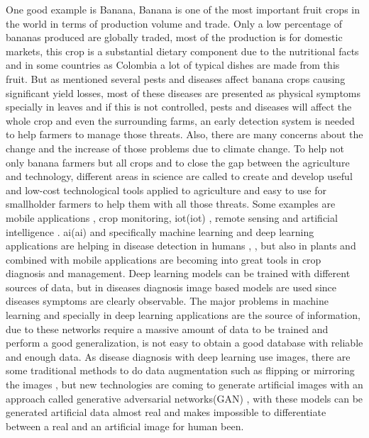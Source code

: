 One good example is Banana, Banana is one of the most important fruit crops in the world  in terms of production volume and trade\cite{faostat2014food}. Only a low percentage of bananas produced are globally traded\cite{lescot2013world}, most of the production is for domestic markets, this crop is a substantial dietary component \cite{abele2007bacterial} due to the nutritional facts and in some countries as Colombia a lot of typical dishes are made from this fruit.
But as mentioned several pests and diseases affect banana crops causing significant yield losses\cite{blomme2017bacterial}, most of these diseases are presented as physical symptoms specially in leaves and if this is not controlled, pests and diseases will affect the whole crop and even the surrounding farms, an early detection system is needed to help farmers to manage those threats. Also, there are many concerns about the change and the increase of those problems due to climate change\cite{garrett2013cambio}\cite{hamada2011impacts}. To help not only banana farmers but all crops and to close the gap between the agriculture and technology, different areas in science are called to create and develop useful and low-cost technological tools applied to agriculture and easy to use for smallholder farmers to help them with all those threats. Some examples are mobile applications \cite{qiang2012mobile} , crop monitoring\cite{berni2009thermal}\cite{hunt2010acquisition}, \acrlong{iot}(\acrshort{iot}) \cite{baoyun2009review} , remote sensing\cite{doraiswamy2003crop} and artificial intelligence \cite{murase2000artificial}. 
\acrlong{ai}(\acrshort{ai}) and specifically machine learning and deep learning applications are helping in disease detection in humans 
\cite{esteva2017dermatologist}, \cite{rajpurkar2017chexnet} , \cite{shen2017deep}  but also in plants \cite{mohanty2016using} and combined with mobile applications are becoming into great tools in crop diagnosis and management\cite{ramcharan2017deep}. Deep learning models can be trained with different sources of data, but in diseases diagnosis image based\cite{mohanty2016using} models are used since diseases symptoms are clearly observable. The major problems in machine learning and specially in deep learning applications are the source of information, due to these networks require a massive amount of data to be trained and perform a good generalization, is not easy to obtain a good database with reliable and enough data. As disease diagnosis with deep learning use images, there are some traditional methods to do data augmentation such as flipping or mirroring the images \cite{bloice2017augmentor}, but new technologies are coming to generate artificial images with an approach called generative adversarial networks(GAN)\cite{NIPS2014_5423} \cite{perez2017effectiveness} , with these models can be generated artificial data almost real and makes impossible to differentiate between a real and an artificial image for human been\cite{karras2018style}.

